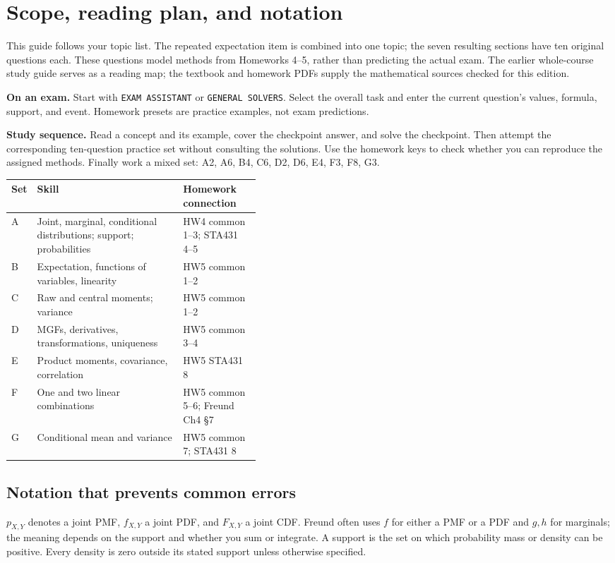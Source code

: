 \section*{Scope, reading plan, and notation}
This guide follows your topic list. The repeated expectation item is combined into one topic; the seven resulting sections have ten original questions each. These questions model methods from Homeworks 4--5, rather than predicting the actual exam. The earlier whole-course study guide serves as a reading map; the textbook and homework PDFs supply the mathematical sources checked for this edition.

\textbf{On an exam.} Start with \texttt{EXAM ASSISTANT} or \texttt{GENERAL SOLVERS}. Select the overall task and enter the current question's values, formula, support, and event. Homework presets are practice examples, not exam predictions.

\textbf{Study sequence.} Read a concept and its example, cover the checkpoint answer, and solve the checkpoint. Then attempt the corresponding ten-question practice set without consulting the solutions. Use the homework keys to check whether you can reproduce the assigned methods. Finally work a mixed set: A2, A6, B4, C6, D2, D6, E4, F3, F8, G3.

\begin{tabularx}{\linewidth}{@{}p{0.10\linewidth}Xp{0.31\linewidth}@{}}
\toprule Set & Skill & Homework connection\\\midrule
A & Joint, marginal, conditional distributions; support; probabilities & HW4 common 1--3; STA431 4--5\\
B & Expectation, functions of variables, linearity & HW5 common 1--2\\
C & Raw and central moments; variance & HW5 common 1--2\\
D & MGFs, derivatives, transformations, uniqueness & HW5 common 3--4\\
E & Product moments, covariance, correlation & HW5 STA431 8\\
F & One and two linear combinations & HW5 common 5--6; Freund Ch4 \S7\\
G & Conditional mean and variance & HW5 common 7; STA431 8\\\bottomrule
\end{tabularx}

\subsection*{Notation that prevents common errors}
$p_{X,Y}$ denotes a joint PMF, $f_{X,Y}$ a joint PDF, and $F_{X,Y}$ a joint CDF. Freund often uses $f$ for either a PMF or a PDF and $g,h$ for marginals; the meaning depends on the support and whether you sum or integrate. A support is the set on which probability mass or density can be positive. Every density is zero outside its stated support unless otherwise specified.

